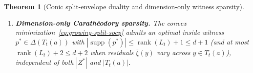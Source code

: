 \documentclass{article}
\theoremstyle{plain}
\newtheorem{theorem}{Theorem}[section]
\theoremstyle{definition}
\DeclareMathOperator{\supp}{supp}
\begin{document}
\begin{theorem}[Conic split-envelope duality and dimension-only witness sparsity]
\begin{enumerate}[label=(\alph*),leftmargin=1.8em]
\begin{align}
         + \bar\xi(v) + \sum_{y \in T_t(a)} p_y \bar\xi(y)
       \Bigr]
       + s_{\mathrm{opt}}(v).
    \label{eq:growing-split-socp}
  \end{align}
  Whenever $v \in T_t$ is a materialized terminal ($\widehat\Phi(v) = \{\phi(v)\}$), $s_{\mathrm{opt}}(v) = 0$ identically and $\widehat D_t^{\mathrm{grow}}(v, T_t(a)) = D_t^{\mathrm{grow}}(v, T_t(a))$.
  \item \textbf{Dimension-only Carath\'eodory sparsity.} The convex minimization~\eqref{eq:growing-split-socp} admits an optimal inside witness $p^* \in \Delta(T_t(a))$ with $|\supp(p^*)| \le \operatorname{rank}(L_t) + 1 \le d + 1$ (and at most $\operatorname{rank}(L_t) + 2 \le d + 2$ when residuals $\bar\xi(y)$ vary across $y \in T_t(a)$), independent of both $|Z^*|$ and $|T_t(a)|$.
\end{enumerate}
\end{theorem}
\end{document}
